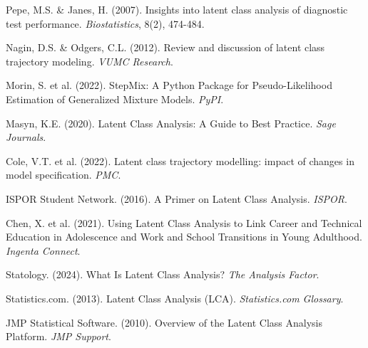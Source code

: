\documentclass[main.tex]{subfiles}
\begin{document}
\begin{thebibliography}{20}
Pepe, M.S. \& Janes, H. (2007). Insights into latent class analysis of diagnostic test performance. \textit{Biostatistics}, 8(2), 474-484.

Nagin, D.S. \& Odgers, C.L. (2012). Review and discussion of latent class trajectory modeling. \textit{VUMC Research}.

Morin, S. et al. (2022). StepMix: A Python Package for Pseudo-Likelihood Estimation of Generalized Mixture Models. \textit{PyPI}.

Masyn, K.E. (2020). Latent Class Analysis: A Guide to Best Practice. \textit{Sage Journals}.

Cole, V.T. et al. (2022). Latent class trajectory modelling: impact of changes in model specification. \textit{PMC}.

ISPOR Student Network. (2016). A Primer on Latent Class Analysis. \textit{ISPOR}.

Chen, X. et al. (2021). Using Latent Class Analysis to Link Career and Technical Education in Adolescence and Work and School Transitions in Young Adulthood. \textit{Ingenta Connect}.

Statology. (2024). What Is Latent Class Analysis? \textit{The Analysis Factor}.

Statistics.com. (2013). Latent Class Analysis (LCA). \textit{Statistics.com Glossary}.

JMP Statistical Software. (2010). Overview of the Latent Class Analysis Platform. \textit{JMP Support}.

\end{thebibliography}
\end{document}
